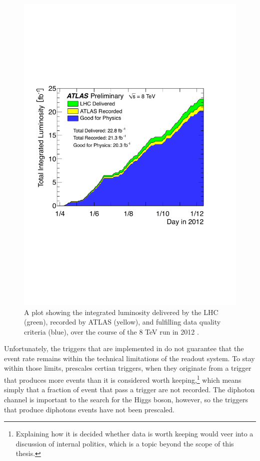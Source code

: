 \begin{figure}[htp]
\begin{minipage}[b]{.69\textwidth}
\hspace{-1em}\includegraphics[width=\textwidth]{figures/intlumi}
\end{minipage}\hfill\begin{minipage}[b]{.3\textwidth}
\caption{A plot showing the integrated luminosity delivered by the LHC (green), recorded by ATLAS (yellow), and fulfilling data quality criteria (blue), over the course of the 8 TeV run in 2012 \cite{publiclumi}.
\label{intlumi}}
\end{minipage}
\end{figure}

Unfortunately, the triggers that are implemented in \atlas{} do not guarantee that the event rate remains within the technical limitations of the readout system. To stay within those limits, \atlas{} prescales certian triggers, when they originate from a trigger that produces more events than it is considered worth keeping,\footnote{Explaining how it is decided whether data is worth keeping would veer into a discussion of \atlas{} internal politics, which is a topic beyond the scope of this thesis.} which means simply that a fraction of event that pass a trigger are not recorded. The diphoton channel is important to the search for the Higgs boson, however, so the triggers that produce diphotons events have not been prescaled.
